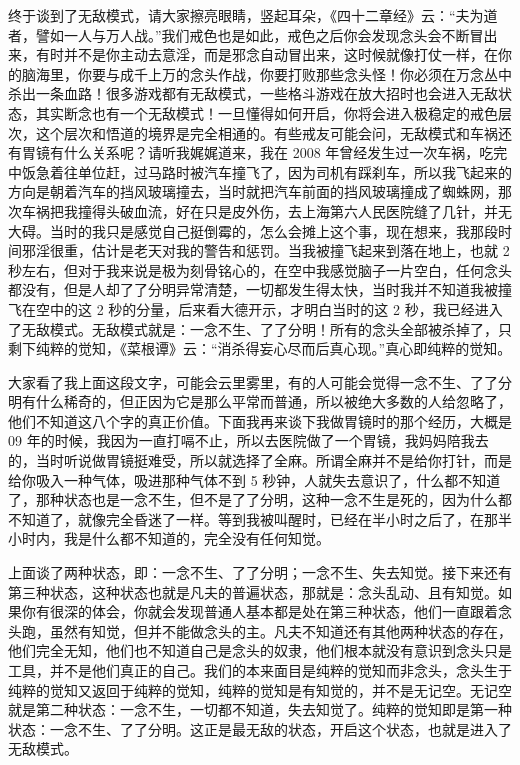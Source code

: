 终于谈到了无敌模式，请大家擦亮眼睛，竖起耳朵，《四十二章经》云：“夫为道者，譬如一人与万人战。”我们戒色也是如此，戒色之后你会发现念头会不断冒出来，有时并不是你主动去意淫，而是邪念自动冒出来，这时候就像打仗一样，在你的脑海里，你要与成千上万的念头作战，你要打败那些念头怪！你必须在万念丛中杀出一条血路！很多游戏都有无敌模式，一些格斗游戏在放大招时也会进入无敌状态，其实断念也有一个无敌模式！一旦懂得如何开启，你将会进入极稳定的戒色层次，这个层次和悟道的境界是完全相通的。有些戒友可能会问，无敌模式和车祸还有胃镜有什么关系呢？请听我娓娓道来，我在 2008 年曾经发生过一次车祸，吃完中饭急着往单位赶，过马路时被汽车撞飞了，因为司机有踩刹车，所以我飞起来的方向是朝着汽车的挡风玻璃撞去，当时就把汽车前面的挡风玻璃撞成了蜘蛛网，那次车祸把我撞得头破血流，好在只是皮外伤，去上海第六人民医院缝了几针，并无大碍。当时的我只是感觉自己挺倒霉的，怎么会摊上这个事，现在想来，我那段时间邪淫很重，估计是老天对我的警告和惩罚。当我被撞飞起来到落在地上，也就 2 秒左右，但对于我来说是极为刻骨铭心的，在空中我感觉脑子一片空白，任何念头都没有，但是人却了了分明异常清楚，一切都发生得太快，当时我并不知道我被撞飞在空中的这 2 秒的分量，后来看大德开示，才明白当时的这 2 秒，我已经进入了无敌模式。无敌模式就是：一念不生、了了分明！所有的念头全部被杀掉了，只剩下纯粹的觉知，《菜根谭》云：“消杀得妄心尽而后真心现。”真心即纯粹的觉知。

大家看了我上面这段文字，可能会云里雾里，有的人可能会觉得一念不生、了了分明有什么稀奇的，但正因为它是那么平常而普通，所以被绝大多数的人给忽略了，他们不知道这八个字的真正价值。下面我再来谈下我做胃镜时的那个经历，大概是 09 年的时候，我因为一直打嗝不止，所以去医院做了一个胃镜，我妈妈陪我去的，当时听说做胃镜挺难受，所以就选择了全麻。所谓全麻并不是给你打针，而是给你吸入一种气体，吸进那种气体不到 5 秒钟，人就失去意识了，什么都不知道了，那种状态也是一念不生，但不是了了分明，这种一念不生是死的，因为什么都不知道了，就像完全昏迷了一样。等到我被叫醒时，已经在半小时之后了，在那半小时内，我是什么都不知道的，完全没有任何知觉。

上面谈了两种状态，即：一念不生、了了分明；一念不生、失去知觉。接下来还有第三种状态，这种状态也就是凡夫的普遍状态，那就是：念头乱动、且有知觉。如果你有很深的体会，你就会发现普通人基本都是处在第三种状态，他们一直跟着念头跑，虽然有知觉，但并不能做念头的主。凡夫不知道还有其他两种状态的存在，他们完全无知，他们也不知道自己是念头的奴隶，他们根本就没有意识到念头只是工具，并不是他们真正的自己。我们的本来面目是纯粹的觉知而非念头，念头生于纯粹的觉知又返回于纯粹的觉知，纯粹的觉知是有知觉的，并不是无记空。无记空就是第二种状态：一念不生，一切都不知道，失去知觉了。纯粹的觉知即是第一种状态：一念不生、了了分明。这正是最无敌的状态，开启这个状态，也就是进入了无敌模式。

